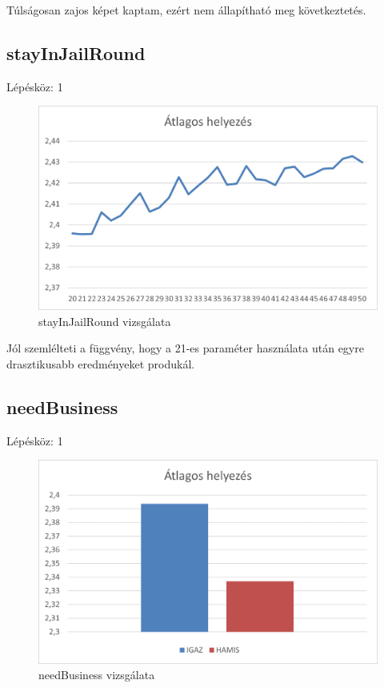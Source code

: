 Túlságosan zajos képet kaptam, ezért nem állapítható meg következtetés.
\newpage
\subsection{stayInJailRound}
Lépésköz: 1
\begin{figure}[h!]
\centering
\includegraphics[scale=0.2]{images/dfg.png}
\caption{stayInJailRound vizsgálata}
\label{fig:ff}
\end{figure}

Jól szemlélteti a függvény, hogy a 21-es paraméter használata után egyre drasztikusabb eredményeket produkál.

\subsection{needBusiness}
Lépésköz: 1
\begin{figure}[h!]
\centering
\includegraphics[scale=0.2]{images/bbbbbb.png}
\caption{needBusiness vizsgálata}
\label{fig:ff}
\end{figure}

